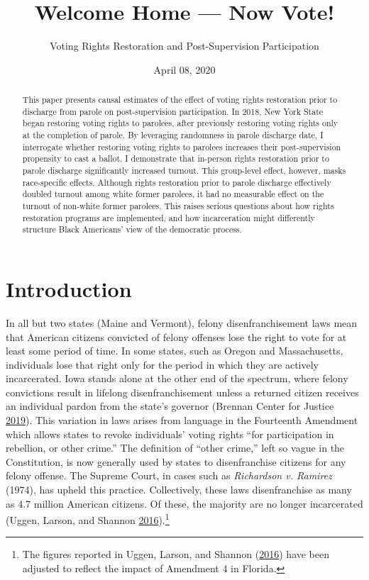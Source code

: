 \documentclass[
  12pt,
]{article}
\title{Welcome Home --- Now Vote!}
\subtitle{Voting Rights Restoration and Post-Supervision Participation}
\date{April 08, 2020}
\begin{document}
\maketitle
\begin{abstract}
This paper presents causal estimates of the effect of voting rights restoration prior to discharge from parole on post-supervision participation. In 2018, New York State began restoring voting rights to parolees, after previously restoring voting rights only at the completion of parole. By leveraging randomness in parole discharge date, I interrogate whether restoring voting rights to parolees increases their post-supervision propensity to cast a ballot. I demonstrate that in-person rights restoration prior to parole discharge significantly increased turnout. This group-level effect, however, masks race-specific effects. Although rights restoration prior to parole discharge effectively doubled turnout among white former parolees, it had no measurable effect on the turnout of non-white former parolees. This raises serious questions about how rights restoration programs are implemented, and how incarceration might differently structure Black Americans' view of the democratic process.
\end{abstract}

\pagebreak
\doublespacing


\hypertarget{introduction}{%
\section*{Introduction}\label{introduction}}

In all but two states (Maine and Vermont), felony disenfranchisement laws mean that American citizens convicted of felony offenses lose the right to vote for at least some period of time. In some states, such as Oregon and Massachusetts, individuals lose that right only for the period in which they are actively incarcerated. Iowa stands alone at the other end of the spectrum, where felony convictions result in lifelong disenfranchisement unless a returned citizen receives an individual pardon from the state's governor (Brennan Center for Justice \protect\hyperlink{ref-bcj_laws}{2019}). This variation in laws arises from language in the Fourteenth Amendment which allows states to revoke individuals' voting rights ``for participation in rebellion, or other crime.'' The definition of ``other crime,'' left so vague in the Constitution, is now generally used by states to disenfranchise citizens for any felony offense. The Supreme Court, in cases such as \emph{Richardson v. Ramirez} (1974), has upheld this practice. Collectively, these laws disenfranchise as many as 4.7 million American citizens. Of these, the majority are no longer incarcerated (Uggen, Larson, and Shannon \protect\hyperlink{ref-sentencing_2016}{2016}).\footnote{The figures reported in Uggen, Larson, and Shannon (\protect\hyperlink{ref-sentencing_2016}{2016}) have been adjusted to reflect the impact of Amendment 4 in Florida.}
\end{document}
